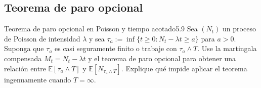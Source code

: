\documentclass[10pt,a4paper]{article}
\begin{document}
\newpage
\subsection{Teorema de paro opcional}

\begin{ejercicio}{Teorema de paro opcional en Poisson y tiempo acotado}{5.9}
    Sea $(N_t)$ un proceso de Poisson de intensidad $\lambda$ y sea $\tau_a := \inf\{t \ge 0 : N_t - \lambda t \ge a\}$ para $a > 0$. Suponga que $\tau_a$ es casi seguramente finito o trabaje con $\tau_a \wedge T$. Use la martingala compensada $M_t = N_t - \lambda t$ y el teorema de paro opcional para obtener una relación entre $\mathbb{E}[\tau_a \wedge T]$ y $\mathbb{E}[N_{\tau_a \wedge T}]$. Explique qué impide aplicar el teorema ingenuamente cuando $T = \infty$.
\end{ejercicio}
\end{document}
